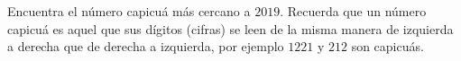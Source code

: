 Encuentra el número capicuá más cercano a $2019$. Recuerda que un número capicuá es aquel que sus dígitos (cifras) se leen de la misma manera de izquierda a derecha que de derecha a izquierda, por ejemplo $1221$ y $212$ son capicuás.